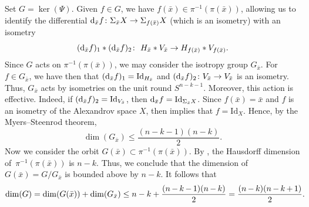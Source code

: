 \documentclass[10pt,a4paper]{amsart}
\numberwithin{equation}{section}
\theoremstyle{definition}
\begin{document}
Set $G = \ker(\Psi)$. Given $f\in G$, we have $f(\bar{x})\in \pi^{-1}(\pi(\bar{x}))$, allowing us to identify the differential ${\rm d}_{\bar{x}} f \colon \Sigma_{\bar{x}} X\to \Sigma_{f(\bar{x})} X$ (which is an isometry) with an isometry
\[
({\rm d}_{\bar{x}}f)_1 * ({\rm d}_{\bar{x}}f)_2\colon\ H_{\bar{x}}* V_{\bar{x}}\to H_{f(\bar{x})}* V_{f(\bar{x})}.
\]
Since $G$ acts on $\pi^{-1}(\pi(\bar{x}))$, we may consider the isotropy group $G_{\bar{x}}$.
For $f\in G_{\bar{x}}$, we have then that $({\rm d}_{\bar{x}}f)_1=\mathrm{Id}_{H_{\bar{x}}}$ and $({\rm d}_{\bar{x}}f)_2\colon V_{\bar{x}}\to V_{\bar{x}}$ is an isometry.
Thus, $G_{\bar{x}}$ acts by isometries on the unit round $S^{n-k-1}$.
Moreover, this action is effective.
Indeed, if $({\rm d}_{\bar{x}}f)_2 =\mathrm{Id}_{V_{\bar{x}}}$, then ${\rm d}_{\bar{x}}f = \mathrm{Id}_{\Sigma_{\bar{x}} X}$.
Since $f(\bar{x}) = \bar{x}$ and $f$ is an isometry of the Alexandrov space $X$, then \cite[Lemma~3.2]{GalazGarciaGuijarro2013} implies that $f=\mathrm{Id}_X$.
Hence, by the Myers--Steenrod theorem,
\[
 \dim (G_{\bar{x}})\leq \frac{(n-k-1)(n-k)}{2}.
\]
Now we consider the orbit $G(\bar{x})\subset \pi^{-1}(\pi(\bar{x}))$.
By \cite[Korollar 7.5]{Lytchak}, the Hausdorff dimension of~$\pi^{-1}(\pi(\bar{x}))$ is $n-k$.
Thus, we conclude that the dimension of $G(\bar{x})= G/G_{\bar{x}}$ is bounded above by $n-k$. It follows that
\begin{align}
\dim(G)= \dim(G(\bar{x}))+\dim(G_{\bar{x}}) \leq n-k+\frac{(n\hspace{-0.5pt}-\hspace{-0.5pt}k\hspace{-0.5pt}-\hspace{-0.5pt}1)(n\hspace{-0.5pt}-\hspace{-0.5pt}k)}{2}
= \frac{(n\hspace{-0.5pt}-\hspace{-0.5pt}k)(n\hspace{-0.5pt}-\hspace{-0.5pt}k\hspace{-0.5pt}+\hspace{-0.5pt}1)}{2}.\!\!\!\!\label{eq:bound.alex.1}
\end{align}
\end{document}
